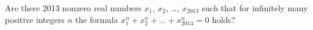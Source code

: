 \problem{}
Are there 2013 nonzero real numbers
$x_1$, $x_2$, \ldots, $x_{2013}$ such
that for infinitely many positive integers $n$ the formula $x_1 ^ n + x_2 ^ n + \ldots + x_ {2013} ^ n = 0$ holds?
\solution
\endproblem
